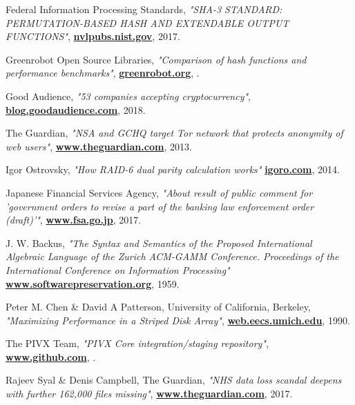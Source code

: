\documentclass[10pt,a4paper,final]{article}
\let\oldhref\href
\renewcommand{\href}[2]{\oldhref{#1}{\bfseries#2}}
\begin{document}
\begin{thebibliography}{999}
	Federal Information Processing Standards,
	\emph{"SHA-3 STANDARD: PERMUTATION-BASED HASH AND EXTENDABLE OUTPUT FUNCTIONS"},
	\href{https://nvlpubs.nist.gov/nistpubs/FIPS/NIST.FIPS.202.pdf}{nvlpubs.nist.gov},
	2017.

	Greenrobot Open Source Libraries,
	\emph{"Comparison of hash functions and performance benchmarks"},
	\href{https://greenrobot.org/essentials/features/performant-hash-functions-for-java/comparison-of-hash-functions}{greenrobot.org},
	\the\year{}.


	Good Audience,
	\emph{"53 companies accepting cryptocurrency"},
	\href{https://blog.goodaudience.com/companies-accepting-cryptocurrency-4e224d72e25b}{blog.goodaudience.com},
	2018.

	The Guardian,
	\emph{"NSA and GCHQ target Tor network that protects anonymity of web users"},
	\href{https://www.theguardian.com/world/2013/oct/04/nsa-gchq-attack-tor-network-encryption}{www.theguardian.com},
	2013.

	Igor Ostrovsky,
	\emph{"How RAID-6 dual parity calculation works"}
	\href{https://igoro.com/archive/how-raid-6-dual-parity-calculation-works/}{igoro.com},
	2014.

	Japanese Financial Services Agency,
	\emph{"About result of public comment for 'government orders to revise a part of the banking law enforcement order (draft)'"},
	\href{https://www.fsa.go.jp/news/28/ginkou/20170324-1.html}{www.fsa.go.jp},
	2017.

	J. W. Backus,
	\emph{"The Syntax and Semantics of the Proposed International Algebraic Language of the Zurich ACM-GAMM Conference. Proceedings of the International Conference on Information Processing"}
	\href{http://www.softwarepreservation.org/projects/ALGOL/paper/Backus-Syntax_and_Semantics_of_Proposed_IAL.pdf}{www.softwarepreservation.org},
	1959.

	Peter M. Chen \& David A Patterson, University of California, Berkeley,
	\emph{"Maximizing Performance in a Striped Disk Array"},
	\href{http://web.eecs.umich.edu/~pmchen/Rio/papers/chen90_1.pdf}{web.eecs.umich.edu},
	1990.

	The PIVX Team,
	\emph{"PIVX Core integration/staging repository"},
	\href{https://github.com/PIVX-Project/PIVX}{www.github.com},
	\the\year{}.

	Rajeev Syal \& Denis Campbell, The Guardian,
	\emph{"NHS data loss scandal deepens with further 162,000 files missing"},
	\href{https://www.theguardian.com/society/2017/oct/16/nhs-data-loss-scandal-deepens-with-162000-more-files-missing}{www.theguardian.com},
	2017.


\end{thebibliography}
\end{document}
